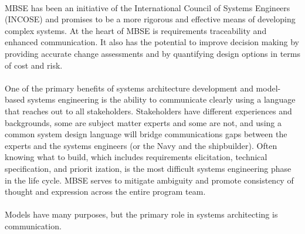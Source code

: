 \documentclass[a4paper,12pt,twoside]{report}
\begin{document}
			\paragraph{} {MBSE has been an initiative of the International Council of Systems Engineers (INCOSE) and promises to be a more rigorous and effective means of developing complex systems. At the heart of MBSE is requirements traceability and enhanced communication. It also has the potential to improve decision making by providing accurate change assessments and by quantifying design options in terms of cost and risk. \cite{MBSESystemArchitectureNavalShipDesign}
			}
			
			\paragraph{} {One of the primary benefits of systems architecture development and model-based systems engineering is the ability to communicate clearly using a language that reaches out to all stakeholders. Stakeholders have different experiences and backgrounds, some are subject matter experts and some are not, and using a common system design language will bridge communications gaps between the experts and the systems engineers (or the Navy and the shipbuilder). Often knowing what to build, which includes requirements elicitation, technical specification, and priorit ization, is the most difficult systems engineering phase in the life cycle. MBSE serves to mitigate ambiguity and promote consistency of thought and expression across the entire program team. \cite{MBSESystemArchitectureNavalShipDesign}
			}
									
			\paragraph{} {Models have many purposes, but the primary role in systems architecting is communication. \cite{MBSESystemArchitectureNavalShipDesign}
			}
			
\end{document}

